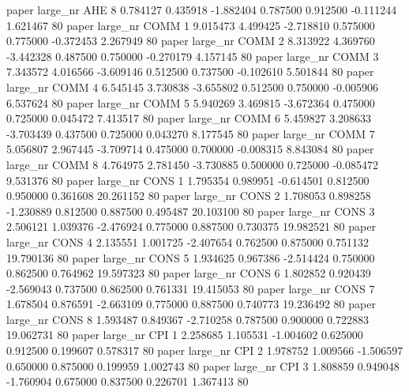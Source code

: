               paper   large_nr      AHE                 8  0.784127  0.435918  -1.882404 0.787500 0.912500 -0.111244    1.621467 80
              paper   large_nr     COMM                 1  9.015473  4.499425  -2.718810 0.575000 0.775000 -0.372453    2.267949 80
              paper   large_nr     COMM                 2  8.313922  4.369760  -3.442328 0.487500 0.750000 -0.270179    4.157145 80
              paper   large_nr     COMM                 3  7.343572  4.016566  -3.609146 0.512500 0.737500 -0.102610    5.501844 80
              paper   large_nr     COMM                 4  6.545145  3.730838  -3.655802 0.512500 0.750000 -0.005906    6.537624 80
              paper   large_nr     COMM                 5  5.940269  3.469815  -3.672364 0.475000 0.725000  0.045472    7.413517 80
              paper   large_nr     COMM                 6  5.459827  3.208633  -3.703439 0.437500 0.725000  0.043270    8.177545 80
              paper   large_nr     COMM                 7  5.056807  2.967445  -3.709714 0.475000 0.700000 -0.008315    8.843084 80
              paper   large_nr     COMM                 8  4.764975  2.781450  -3.730885 0.500000 0.725000 -0.085472    9.531376 80
              paper   large_nr     CONS                 1  1.795354  0.989951  -0.614501 0.812500 0.950000  0.361608   20.261152 80
              paper   large_nr     CONS                 2  1.708053  0.898258  -1.230889 0.812500 0.887500  0.495487   20.103100 80
              paper   large_nr     CONS                 3  2.506121  1.039376  -2.476924 0.775000 0.887500  0.730375   19.982521 80
              paper   large_nr     CONS                 4  2.135551  1.001725  -2.407654 0.762500 0.875000  0.751132   19.790136 80
              paper   large_nr     CONS                 5  1.934625  0.967386  -2.514424 0.750000 0.862500  0.764962   19.597323 80
              paper   large_nr     CONS                 6  1.802852  0.920439  -2.569043 0.737500 0.862500  0.761331   19.415053 80
              paper   large_nr     CONS                 7  1.678504  0.876591  -2.663109 0.775000 0.887500  0.740773   19.236492 80
              paper   large_nr     CONS                 8  1.593487  0.849367  -2.710258 0.787500 0.900000  0.722883   19.062731 80
              paper   large_nr      CPI                 1  2.258685  1.105531  -1.004602 0.625000 0.912500  0.199607    0.578317 80
              paper   large_nr      CPI                 2  1.978752  1.009566  -1.506597 0.650000 0.875000  0.199959    1.002743 80
              paper   large_nr      CPI                 3  1.808859  0.949048  -1.760904 0.675000 0.837500  0.226701    1.367413 80

